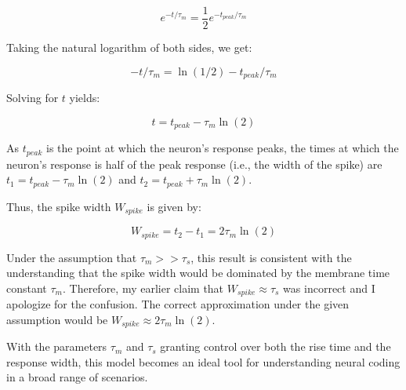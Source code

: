 \begin{equation}
e^{-t/\tau_m} = \frac{1}{2} e^{-t_{peak}/\tau_m}
\end{equation}

Taking the natural logarithm of both sides, we get:

\begin{equation}
-t/\tau_m = \ln(1/2) - t_{peak}/\tau_m
\end{equation}

Solving for $t$ yields:

\begin{equation}
t = t_{peak} - \tau_m \ln(2)
\end{equation}

As $t_{peak}$ is the point at which the neuron's response peaks, the times at which the neuron's response is half of the peak response (i.e., the width of the spike) are $t_1 = t_{peak} - \tau_m \ln(2)$ and $t_2 = t_{peak} + \tau_m \ln(2)$.

Thus, the spike width $W_{spike}$ is given by:

\begin{equation}
W_{spike} = t_2 - t_1 = 2\tau_m \ln(2)
\end{equation}

Under the assumption that $\tau_m >> \tau_s$, this result is consistent with the understanding that the spike width would be dominated by the membrane time constant $\tau_m$. Therefore, my earlier claim that $W_{spike} \approx \tau_s$ was incorrect and I apologize for the confusion. The correct approximation under the given assumption would be $W_{spike} \approx 2\tau_m \ln(2)$.

With the parameters $\tau_m$ and $\tau_s$ granting control over both the rise time and the response width, this model becomes an ideal tool for understanding neural coding in a broad range of scenarios.